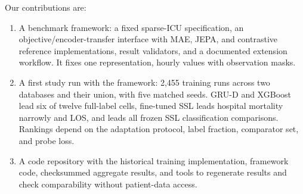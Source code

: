 Our contributions are:
\begin{enumerate}
  \item A benchmark framework: a fixed sparse-ICU specification, an objective/encoder-transfer interface with MAE, JEPA, and contrastive reference implementations, result validators, and a documented extension workflow. It fixes one representation, hourly values with observation masks.
  \item A first study run with the framework: 2,455 training runs across two databases and their union, with five matched seeds. GRU-D and XGBoost lead six of twelve full-label cells, fine-tuned SSL leads hospital mortality narrowly and LOS, and \MAE{} leads all frozen SSL classification comparisons. Rankings depend on the adaptation protocol, label fraction, comparator set, and probe loss.
  \item A code repository with the historical training implementation, framework code, checksummed aggregate results, and tools to regenerate results and check comparability without patient-data access.
\end{enumerate}
